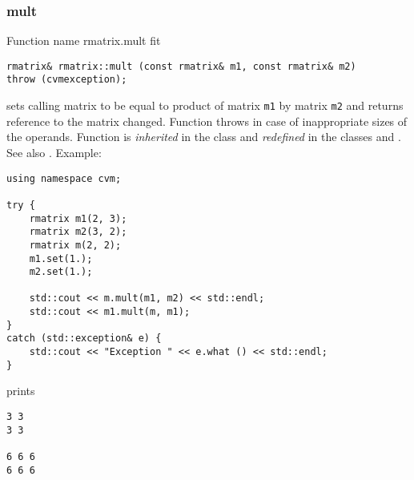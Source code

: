 \subsubsection{mult}
Function%
\pdfdest name {rmatrix.mult} fit
\begin{verbatim}
rmatrix& rmatrix::mult (const rmatrix& m1, const rmatrix& m2)
throw (cvmexception);
\end{verbatim}
sets  calling matrix to be equal to  product of  matrix
\verb"m1" by  matrix \verb"m2"
and returns  reference to
the matrix changed.
Function throws  
in case of inappropriate sizes of the operands.
Function is \emph{inherited} in the class 
and \emph{redefined} in the classes
 and
.
See also
.
Example:
\begin{Verbatim}
using namespace cvm;

try {
    rmatrix m1(2, 3);
    rmatrix m2(3, 2);
    rmatrix m(2, 2);
    m1.set(1.);
    m2.set(1.);

    std::cout << m.mult(m1, m2) << std::endl;
    std::cout << m1.mult(m, m1);
}
catch (std::exception& e) {
    std::cout << "Exception " << e.what () << std::endl;
}
\end{Verbatim}
prints
\begin{Verbatim}
3 3
3 3

6 6 6
6 6 6
\end{Verbatim}
\newpage



